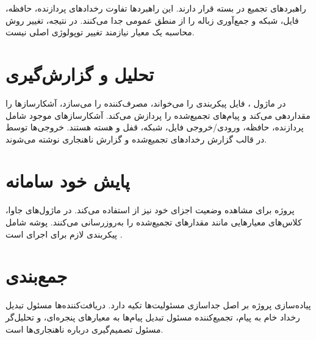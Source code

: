 راهبردهای تجمیع در بسته  قرار دارند. این راهبردها تفاوت رخدادهای پردازنده، حافظه، فایل، شبکه و جمع‌آوری زباله را از منطق عمومی  جدا می‌کنند. در نتیجه، تغییر روش محاسبه یک معیار نیازمند تغییر توپولوژی اصلی نیست.

\section{تحلیل و گزارش‌گیری}
در ماژول ، فایل  پیکربندی را می‌خواند، مصرف‌کننده  را می‌سازد، آشکارسازها را مقداردهی می‌کند و پیام‌های تجمیع‌شده را پردازش می‌کند. آشکارسازهای موجود شامل پردازنده، حافظه، ورودی/خروجی فایل، شبکه، قفل و هسته هستند. خروجی‌ها توسط  در قالب گزارش رخدادهای تجمیع‌شده و گزارش ناهنجاری نوشته می‌شوند.

\section{پایش خود سامانه}
پروژه برای مشاهده وضعیت اجزای خود نیز از  استفاده می‌کند. در ماژول‌های جاوا، کلاس‌های  معیارهایی مانند مقدارهای تجمیع‌شده را به‌روزرسانی می‌کنند. پوشه  شامل پیکربندی لازم برای اجرای  است \cite{prometheusdocs}.

\section{جمع‌بندی}
پیاده‌سازی پروژه بر اصل جداسازی مسئولیت‌ها تکیه دارد. دریافت‌کننده‌ها مسئول تبدیل رخداد خام به پیام، تجمیع‌کننده مسئول تبدیل پیام‌ها به معیارهای پنجره‌ای، و تحلیل‌گر مسئول تصمیم‌گیری درباره ناهنجاری‌ها است.
